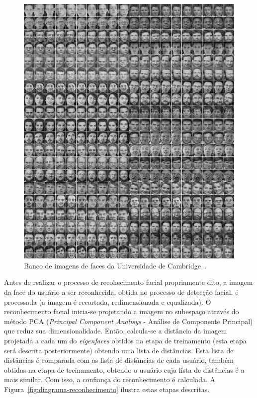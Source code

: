 		\begin{figure}[H]
			\begin{center}
				\includegraphics[scale=0.3]{figuras/4.ProblemaEProposta/cambrigdefacedb.png}
			\end{center}
			\caption{Banco de imagens de faces da Universidade de Cambridge~\cite{cambridgeFaceDb}.}
			\label{fig:cambridgeFaceDb}
		\end{figure}


		Antes de realizar o processo de recohecimento facial propriamente dito, a imagem da face do usuário a ser reconhecida, obtida no processo de detecção facial, é processada (a imagem é recortada, redimensionada e equalizada). O reconhecimento facial inicia-se projetando a imagem no subespaço através do método PCA (\textit{Principal Component Analisys} - Análise de Componente Principal) que reduz sua dimensionalidade. Então, calcula-se a distância da imagem projetada a cada um do \textit{eigenfaces} obtidos na etapa de treinamento (esta etapa será descrita posteriormente) obtendo uma lista de distâncias. Esta lista de distâncias é comparada com as lista de distâncias de cada usuário, também obtidas na etapa de treinamento, obtendo o usuário cuja lista de distâncias é a mais similar. Com isso, a confiança do reconhecimento é calculada. A Figura~\ref{fig:diagrama-reconhecimento} ilustra estas etapas descritas.

